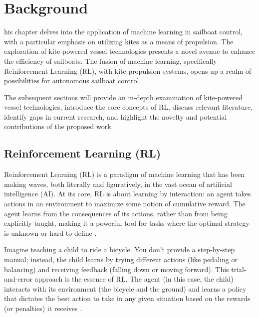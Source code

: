 %

%
\let\textcircled=\pgftextcircled
\chapter{Background}
\label{chap:background}

his chapter delves into the application of machine learning in sailboat control, with a particular emphasis on utilizing kites as a means of propulsion. The exploration of kite-powered vessel technologies presents a novel avenue to enhance the efficiency of sailboats. The fusion of machine learning, specifically Reinforcement Learning (RL), with kite propulsion systems, opens up a realm of possibilities for autonomous sailboat control. 



The subsequent sections will provide an in-depth examination of kite-powered vessel technologies, introduce the core concepts of RL, discuss relevant literature, identify gaps in current research, and highlight the novelty and potential contributions of the proposed work. 


\section{Reinforcement Learning (RL)}

Reinforcement Learning (RL) is a paradigm of machine learning that has been making waves, both literally and figuratively, in the vast ocean of artificial intelligence (AI). At its core, RL is about learning by interaction: an agent takes actions in an environment to maximize some notion of cumulative reward. The agent learns from the consequences of its actions, rather than from being explicitly taught, making it a powerful tool for tasks where the optimal strategy is unknown or hard to define \cite{sutton2018reinforcement}.

Imagine teaching a child to ride a bicycle. You don't provide a step-by-step manual; instead, the child learns by trying different actions (like pedaling or balancing) and receiving feedback (falling down or moving forward). This trial-and-error approach is the essence of RL. The agent (in this case, the child) interacts with its environment (the bicycle and the ground) and learns a policy that dictates the best action to take in any given situation based on the rewards (or penalties) it receives \cite{watkins1992qlearning}.

